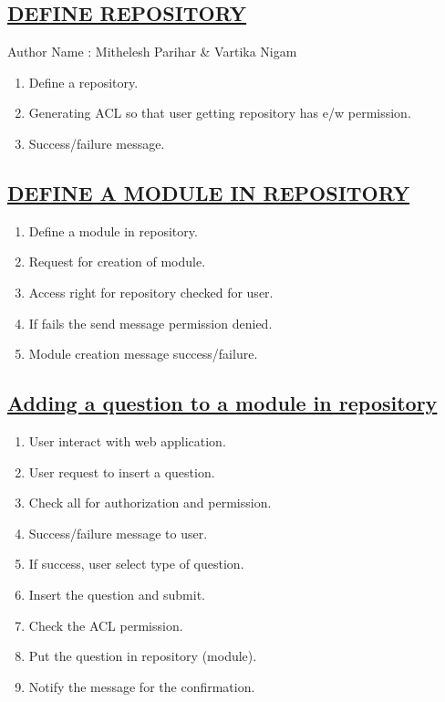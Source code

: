 \documentclass{article}
\begin{document}
\begin{center}

\section*{\underline{DEFINE REPOSITORY}}
              Author Name : Mithelesh Parihar \& Vartika Nigam
\end{center}
\begin{enumerate}
\item Define a repository.
\item Generating ACL so that user getting repository has e/w permission.
\item Success/failure message.
\begin{center}

\end{center}
\end{enumerate}
\subsection*{\underline{DEFINE A MODULE IN REPOSITORY}}
\begin{enumerate}
\item Define a module in repository.
\item Request for creation of module.
\item Access right for repository checked for user.
\item If fails the send message permission denied.
\item Module creation message success/failure.


\end{enumerate}
\subsection*{\underline{Adding a question to a module in repository}}
\begin{enumerate}
\item User interact with web application. 
\item User request to insert a question. 
\item Check all for authorization and permission. 
\item Success/failure message to user. 
\item If success, user select type of question. 
\item Insert the question and submit. 
\item Check the ACL permission. 
\item Put the question in repository (module). 
\item Notify the message for the confirmation. 
\end{enumerate}
\end{document}
